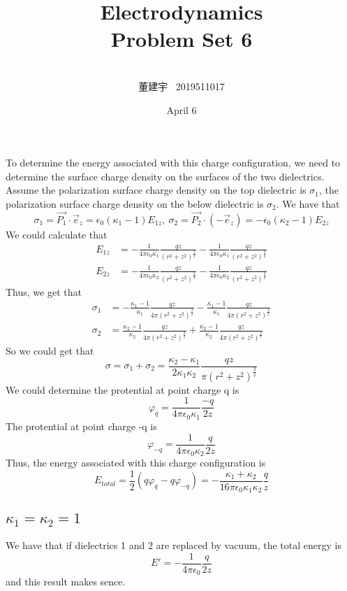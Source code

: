 \documentclass[10.5pt]{article}
\title{Electrodynamics \\Problem Set 6\\}
\author{\\董建宇 ~2019511017}
\date{April 6}
\begin{document}
    
\maketitle
\newpage

\section{}
To determine the energy associated with this charge configuration, we need to determine the surface charge density on the surfaces of the two dielectrics. Assume the polarization surface charge density on the top dielectric is $\sigma_1$, the polarization surface charge density on the below dielectric is $\sigma_2$. We have that $$\sigma_1 = \vec{P_1}\cdot\vec{e}_z = \epsilon_0(\kappa_1-1)E_{1z},~\sigma_2 = \vec{P_2}\cdot(-\vec{e}_z) = -\epsilon_0(\kappa_2-1)E_{2z}$$\indent
We could calculate that $$\begin{aligned}
    E_{1z}&=-\frac{1}{4\pi\epsilon_0\kappa_1}\frac{qz}{\left(r^2+z^2\right)^{\frac{3}{2}}}-\frac{1}{4\pi\epsilon_0\kappa_1}\frac{qz}{\left(r^2+z^2\right)^{\frac{3}{2}}}\\
    E_{2z}&=-\frac{1}{4\pi\epsilon_0\kappa_2}\frac{qz}{\left(r^2+z^2\right)^{\frac{3}{2}}}-\frac{1}{4\pi\epsilon_0\kappa_2}\frac{qz}{\left(r^2+z^2\right)^{\frac{3}{2}}}
\end{aligned}$$\indent
Thus, we get that $$\begin{aligned}
    \sigma_1&=-\frac{\kappa_1-1}{\kappa_1}\frac{qz}{4\pi\left(r^2+z^2\right)^{\frac{3}{2}}}-\frac{\kappa_1-1}{\kappa_1}\frac{qz}{4\pi\left(r^2+z^2\right)^{\frac{3}{2}}}\\
    \sigma_2&=\frac{\kappa_2-1}{\kappa_2}\frac{qz}{4\pi\left(r^2+z^2\right)^{\frac{3}{2}}}+\frac{\kappa_2-1}{\kappa_2}\frac{qz}{4\pi\left(r^2+z^2\right)^{\frac{3}{2}}}
\end{aligned}$$\indent
So we could get that $$\sigma=\sigma_1+\sigma_2=\frac{\kappa_2-\kappa_1}{2\kappa_1\kappa_2}\frac{qz}{\pi\left(r^2+z^2\right)^{\frac{3}{2}}}$$\indent
We could determine the protential at point charge q is $$\varphi_q=\frac{1}{4\pi\epsilon_0\kappa_1}\frac{-q}{2z}$$\indent
The protential at point charge -q is $$\varphi_{-q}=\frac{1}{4\pi\epsilon_0\kappa_2}\frac{q}{2z}$$\indent
Thus, the energy associated with this charge configuration is $$E_{total}=\frac{1}{2}\left(q\varphi_q-q\varphi_{-q}\right)=-\frac{\kappa_1+\kappa_2}{16\pi\epsilon_0\kappa_1\kappa_2}\frac{q}{z}$$\indent
\subsection{$\kappa_1=\kappa_2=1$}
We have that if dielectrics 1 and 2 are replaced by vacuum, the total energy is $$E'=-\frac{1}{4\pi\epsilon_0}\frac{q}{2z}$$\indent
and this result makes sence.
\end{document}
